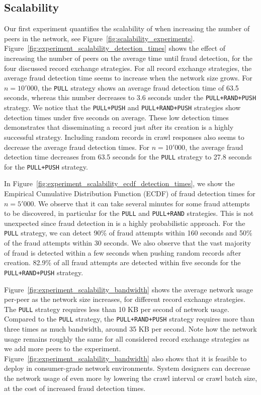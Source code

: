 \subsection{Scalability}
\label{sec:fraud_detection_experiment}
Our first experiment quantifies the scalability of \ModelName{} when increasing the number of peers in the network, see Figure~\ref{fig:scalability_experiments}.
Figure~\ref{fig:experiment_scalability_detection_times} shows the effect of increasing the number of peers on the average time until fraud detection, for the four discussed record exchange strategies.
For all record exchange strategies, the average fraud detection time seems to increase when the network size grows.
For $ n = 10'000 $, the \texttt{PULL} strategy shows an average fraud detection time of 63.5 seconds, whereas this number decreases to 3.6 seconds under the \texttt{PULL+RAND+PUSH} strategy.
We notice that the \texttt{PULL+PUSH} and \texttt{PULL+RAND+PUSH} strategies show detection times under five seconds on average.
These low detection times demonstrates that disseminating a record just after its creation is a highly successful strategy.
Including random records in crawl responses also seems to decrease the average fraud detection times.
For $ n = 10'000 $, the average fraud detection time decreases from 63.5 seconds for the \texttt{PULL} strategy to 27.8 seconds for the \texttt{PULL+PUSH} strategy.

In Figure~\ref{fig:experiment_scalability_ecdf_detection_times}, we show the Empirical Cumulative Distribution Function (ECDF) of fraud detection times for $ n = 5'000 $.
We observe that it can take several minutes for some fraud attempts to be discovered, in particular for the \texttt{PULL} and \texttt{PULL+RAND} strategies.
This is not unexpected since fraud detection in \ModelName{} is a highly probabilistic approach.
For the \texttt{PULL} strategy, we can detect 90\% of fraud attempts within 160 seconds and 50\% of the fraud attempts within 30 seconds.
We also observe that the vast majority of fraud is detected within a few seconds when pushing random records after creation.
82.9\% of all fraud attempts are detected within five seconds for the \texttt{PULL+RAND+PUSH} strategy.

Figure~\ref{fig:experiment_scalability_bandwidth} shows the average network usage per-peer as the network size increases, for different record exchange strategies.
The \texttt{PULL} strategy requires less than 10 KB per second of network usage.
Compared to the \texttt{PULL} strategy, the \texttt{PULL+RAND+PUSH} strategy requires more than three times as much bandwidth, around 35 KB per second.
Note how the network usage remains roughly the same for all considered record exchange strategies as we add more peers to the experiment.
Figure~\ref{fig:experiment_scalability_bandwidth} also shows that it is feasible to deploy \ModelName{} in consumer-grade network environments.
System designers can decrease the network usage of \ModelName{} even more by lowering the crawl interval or crawl batch size, at the cost of increased fraud detection times.


